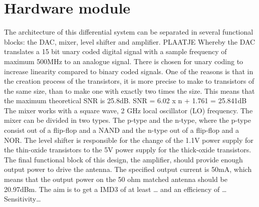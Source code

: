 \section{Hardware module}\label{sec:overview}
The architecture of this differential system can be separated in several functional blocks: the DAC, mixer, level shifter and amplifier.
PLAATJE
Whereby the DAC translates a 15 bit unary coded digital signal with a sample frequency of maximum 500MHz to an analogue signal. There is chosen for unary coding to increase linearity compared to binary coded signals. One of the reasons is that in the creation process of the transistors, it is more precise to make to transistors of the same size, than to make one with exactly two times the size. This means that the maximum theoretical SNR is 25.8dB.
SNR = 6.02 x n + 1.761 = 25.841dB 
The mixer works with a square wave, 2 GHz local oscillator (LO) frequency. The mixer can be divided in two types. The p-type and the n-type, where the p-type consist out of a flip-flop and a NAND and the n-type out of a flip-flop and a NOR.
The level shifter is responsible for the change of the 1.1V power supply for the thin-oxide transistors to the 5V power supply for the thick-oxide transistors.
The final functional block of this design, the amplifier, should provide enough output power to drive the antenna. The specified output current is 50mA, which means that the output power on the 50 ohm matched antenna should be 20.97dBm.
The aim is to get a IMD3 of at least … and an efficiency of … 
Sensitivity…
